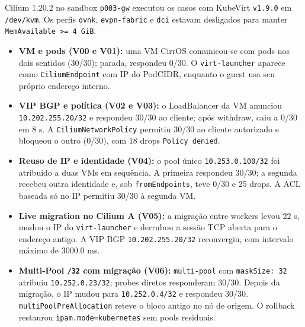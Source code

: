 \documentclass[12pt,openany,oneside,a4paper,chapter=TITLE,english,brazil]{abntex2}
\providecommand{\tightlist}{\setlength{\itemsep}{0pt}\setlength{\parskip}{0pt}}
\begin{document}
Cilium 1.20.2 no sandbox \texttt{p003-{}\allowbreak{}gw} executou os casos com KubeVirt \texttt{v1.\allowbreak{}9.\allowbreak{}0} em \texttt{/\allowbreak{}dev/\allowbreak{}kvm}. Os perfis \texttt{ovnk}, \texttt{evpn-{}\allowbreak{}fabric} e \texttt{dci} estavam desligados para manter \texttt{Mem\allowbreak{}Available \textgreater{}=\allowbreak{} 4 Gi\allowbreak{}B}.

\begin{itemize}
\tightlist
\item
  \textbf{VM e pods (V00 e V01):} uma VM CirrOS comunicou-se com pods nos dois sentidos (30/30); parada, respondeu 0/30. O \texttt{virt-{}\allowbreak{}launcher} aparece como \texttt{Cilium\allowbreak{}Endpoint} com IP do PodCIDR, enquanto o guest usa seu próprio endereço interno.
\item
  \textbf{VIP BGP e política (V02 e V03):} o LoadBalancer da VM anunciou \texttt{10.\allowbreak{}202.\allowbreak{}255.\allowbreak{}20/\allowbreak{}32} e respondeu 30/30 ao cliente; após withdraw, caiu a 0/30 em 8 s. A \texttt{Cilium\allowbreak{}Network\allowbreak{}Policy} permitiu 30/30 ao cliente autorizado e bloqueou o outro (0/30), com 18 drops \texttt{Policy denied}.
\item
  \textbf{Reuso de IP e identidade (V04):} o pool único \texttt{10.\allowbreak{}253.\allowbreak{}0.\allowbreak{}100/\allowbreak{}32} foi atribuído a duas VMs em sequência. A primeira respondeu 30/30; a segunda recebeu outra identidade e, sob \texttt{from\allowbreak{}Endpoints}, teve 0/30 e 25 drops. A ACL baseada só no IP permitiu 30/30 à segunda VM.
\item
  \textbf{Live migration no Cilium A (V05):} a migração entre workers levou 22 s, mudou o IP do \texttt{virt-{}\allowbreak{}launcher} e derrubou a sessão TCP aberta para o endereço antigo. A VIP BGP \texttt{10.\allowbreak{}202.\allowbreak{}255.\allowbreak{}20/\allowbreak{}32} reconvergiu, com intervalo máximo de 3000.0 ms.
\item
  \textbf{Multi-Pool \texttt{/\allowbreak{}32} com migração (V06):} \texttt{multi-{}\allowbreak{}pool} com \texttt{mask\allowbreak{}Size:\allowbreak{} 32} atribuiu \texttt{10.\allowbreak{}252.\allowbreak{}0.\allowbreak{}23/\allowbreak{}32}; probes diretos responderam 30/30. Depois da migração, o IP mudou para \texttt{10.\allowbreak{}252.\allowbreak{}0.\allowbreak{}4/\allowbreak{}32} e respondeu 30/30. \texttt{multi\allowbreak{}Pool\allowbreak{}Pre\allowbreak{}Allocation} reteve o bloco antigo no nó de origem. O rollback restaurou \texttt{ipam.\allowbreak{}mode=\allowbreak{}kubernetes} sem pools residuais.
\end{itemize}
\end{document}
